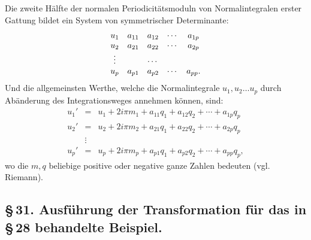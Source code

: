 \documentclass[10pt]{article}
\begin{document}
Die zweite Hälfte der normalen Periodicitätsmoduln von Normalintegralen erster Gattung bildet ein System von symmetrischer Determinante:
\[
\begin{array}{c@{\quad}cccc}
u_1&a_{11}&a_{12}&\cdots&a_{1p}\\
u_2&a_{21}&a_{22}&\cdots&a_{2p}\\
\vdots&&\cdots&&\\
u_p&a_{p1}&a_{p2}&\cdots&a_{pp}.
\end{array}
\]
Und die allgemeinsten Werthe, welche die Normalintegrale \(u_1,u_2\ldots u_p\) durch Abänderung des Integrationsweges annehmen können, sind:
\[
\begin{array}{rcl}
u_1'&=&u_1+2i\pi m_1+a_{11}q_1+a_{12}q_2+\cdots+a_{1p}q_p\\
u_2'&=&u_2+2i\pi m_2+a_{21}q_1+a_{22}q_2+\cdots+a_{2p}q_p\\
&\vdots&\\
u_p'&=&u_p+2i\pi m_p+a_{p1}q_1+a_{p2}q_2+\cdots+a_{pp}q_p,
\end{array}
\]
wo die \(m,q\) beliebige positive oder negative ganze Zahlen bedeuten (vgl. Riemann).

\subsection*{\S\,31. Ausführung der Transformation für das in \S\,28 behandelte Beispiel.}
\end{document}
